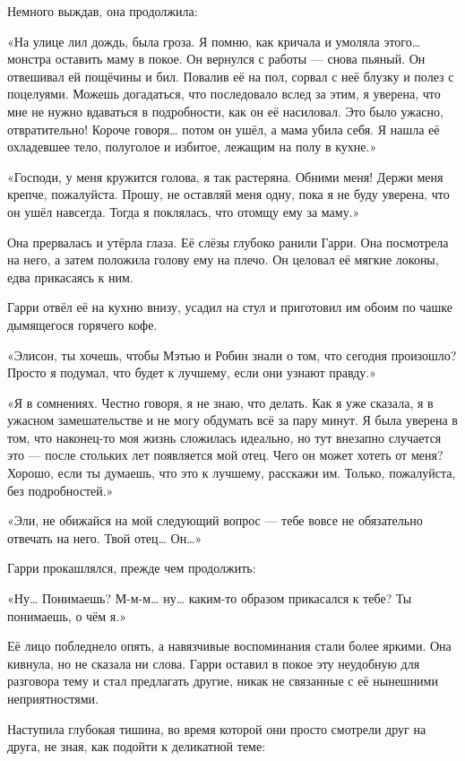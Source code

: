 \documentclass[a5paper, 9pt,
final, openany, twoside=true]{memoir}
\begin{document}
Немного выждав, она продолжила:

«На улице лил дождь, была гроза. Я помню, как кричала и умоляла этого… монстра оставить маму в покое. Он вернулся с работы — снова пьяный. Он отвешивал ей пощёчины и бил. Повалив её на пол, сорвал с неё блузку и полез с поцелуями. Можешь догадаться, что последовало вслед за этим, я уверена, что мне не нужно вдаваться в подробности, как он её насиловал. Это было ужасно, отвратительно! Короче говоря… потом он ушёл, а мама убила себя. Я нашла её охладевшее тело, полуголое и избитое, лежащим на полу в кухне.»

«Господи, у меня кружится голова, я так растеряна. Обними меня! Держи меня крепче, пожалуйста. Прошу, не оставляй меня одну, пока я не буду уверена, что он ушёл навсегда. Тогда я поклялась, что отомщу ему за маму.»

Она прервалась и утёрла глаза. Её слёзы глубоко ранили Гарри. Она посмотрела на него, а затем положила голову ему на плечо. Он целовал её мягкие локоны, едва прикасаясь к ним.

Гарри отвёл её на кухню внизу, усадил на стул и приготовил им обоим по чашке дымящегося горячего кофе.

«Элисон, ты хочешь, чтобы Мэтью и Робин знали о том, что сегодня произошло? Просто я подумал, что будет к лучшему, если они узнают правду.»

«Я в сомнениях. Честно говоря, я не знаю, что делать. Как я уже сказала, я в ужасном замешательстве и не могу обдумать всё за пару минут. Я была уверена в том, что наконец-то моя жизнь сложилась идеально, но тут внезапно случается это — после стольких лет появляется мой отец. Чего он может хотеть от меня? Хорошо, если ты думаешь, что это к лучшему, расскажи им. Только, пожалуйста, без подробностей.»

«Эли, не обижайся на мой следующий вопрос — тебе вовсе не обязательно отвечать на него. Твой отец… Он…»

Гарри прокашлялся, прежде чем продолжить:

«Ну… Понимаешь? М-м-м… ну… каким-то образом прикасался к тебе? Ты понимаешь, о чём я.»

Её лицо побледнело опять, а навязчивые воспоминания стали более яркими. Она кивнула, но не сказала ни слова. Гарри оставил в покое эту неудобную для разговора тему и стал предлагать другие, никак не связанные с её нынешними неприятностями.\bigskip

	Наступила глубокая тишина, во время которой они просто смотрели друг на друга, не зная, как подойти к деликатной теме:
\end{document}
